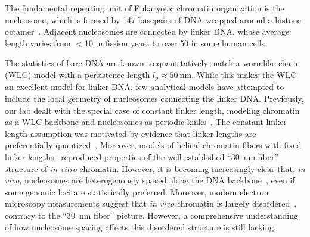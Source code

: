 \documentclass[%
 reprint,
superscriptaddress,
showpacs,preprintnumbers,
 amsmath,amssymb,
 aps,
 prl,
]{revtex4-1}
\begin{document}
The fundamental repeating unit of Eukaryotic chromatin organization is the
    nucleosome, which is formed by 147 basepairs of DNA wrapped around a
    histone octamer~\cite{cutter2015a}.
Adjacent nucleosomes are connected by linker DNA, whose average length varies
    from $<$\SI{10}{\basepair} in fission yeast\cite{givens2012} to over
    \SI{50}{\basepair} in some human cells\cite{schones2008}.

The statistics of bare DNA are known to quantitatively match a wormlike
    chain (WLC) model with a persistence length {$l_p \approx
    \SI{50}{\nano\metre}$}.
While this makes the WLC an excellent model for linker DNA, few analytical
    models have attempted to include the local geometry of nucleosomes connecting
    the linker DNA\@.
Previously, our lab dealt with the special case of constant linker length,
    modeling chromatin as a WLC backbone and nucleosomes as periodic
    kinks~\cite{koslover2013}.
The constant linker length assumption was motivated by evidence
    that linker lengths are preferentially quantized~\cite{widom1992,wang2008a}.
Moreover, models of helical chromatin fibers with fixed linker
    lengths~\cite{wedemann2002} reproduced properties of the well-established ``\SI{30}{\nano\metre} fiber'' structure of \textit{in vitro}
    chromatin.
However, it is becoming increasingly clear that, \textit{in vivo}, nucleosomes
are heterogenously spaced along the DNA backbone~\cite{lai2018,chereji2018,beshnova2014},
    even if some genomic loci are statistically preferred.
Moreover, modern electron microscopy measurements suggest that \textit{in vivo}
    chromatin is largely disordered~\cite{ou2017}, contrary to the
    ``\SI{30}{\nano\metre} fiber'' picture. However, a comprehensive
    understanding of how nucleosome spacing affects this disordered structure is still
    lacking.
\end{document}
